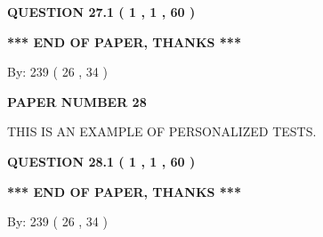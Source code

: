 \documentclass[12pt]{article}
\begin{document}
\vspace{0.2in}
  
{\textbf{\Large{QUESTION
27.1 
 (           1 ,           1 ,          60 )
}}}
  
  
 
 

 
 
   
   
 \vspace{0.2in}
 
   
   
   
   
\vspace{1.0in} 
{\textbf{\large{ *** END OF PAPER, THANKS *** }}} 
   
   
\hspace{1.0in} By: 
         239 (          26 ,           34 )
   
   
   
   
\newpage 
\setcounter{page}{ 
    28001 } 
   
   
   
   
 {\textbf{ \Large{ PAPER NUMBER           28  }}}
   
   
\vspace{0.2in}
   
   
   
   
   
   
 \vspace{0.2in}
{\Huge  THIS IS AN EXAMPLE OF}
{\Huge  PERSONALIZED TESTS. }
   
   
  
\vspace{0.2in}
  
{\textbf{\Large{QUESTION
28.1 
 (           1 ,           1 ,          60 )
}}}
  
  
 
 

 
 
   
   
 \vspace{0.2in}
 
   
   
   
   
\vspace{1.0in} 
{\textbf{\large{ *** END OF PAPER, THANKS *** }}} 
   
   
\hspace{1.0in} By: 
         239 (          26 ,           34 )
   
\end{document}
